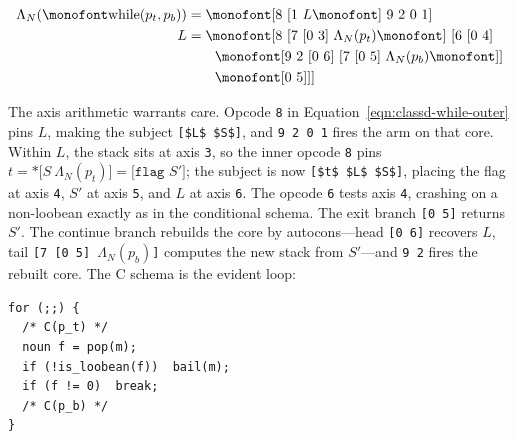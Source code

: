 \documentclass[twoside]{article}
\begin{document}
\begin{subequations}\label{eqn:classd-while}
  \begin{align}
    \Lambda_N(\texttt{while}(p_t, p_b)) &= \texttt{[8\ [1\ } L \texttt{]\ 9\ 2\ 0\ 1]} \label{eqn:classd-while-outer} \\
    L &= \texttt{[8\ [7\ [0\ 3]\ } \Lambda_N(p_t) \texttt{]\ [6\ [0\ 4]} \notag \\
      &\qquad \texttt{[9\ 2\ [0\ 6]\ [7\ [0\ 5]\ } \Lambda_N(p_b) \texttt{]]} \notag \\
      &\qquad \texttt{[0\ 5]]]} \label{eqn:classd-while-arm}
  \end{align}
\end{subequations}

\noindent
The axis arithmetic warrants care.  Opcode \lstinline[style=inlinecode]{8} in Equation~\ref{eqn:classd-while-outer} pins $L$, making the subject \lstinline[style=inlinecode,mathescape]{[$L$ $S$]}, and \lstinline[style=inlinecode]{9 2 0 1} fires the arm on that core.  Within $L$, the stack sits at axis \lstinline[style=inlinecode]{3}, so the inner opcode \lstinline[style=inlinecode]{8} pins $t = \texttt{*[}S\ \Lambda_N(p_t)\texttt{]} = \texttt{[flag\ } S' \texttt{]}$; the subject is now \lstinline[style=inlinecode,mathescape]{[$t$ $L$ $S$]}, placing the flag at axis \lstinline[style=inlinecode]{4}, $S'$ at axis \lstinline[style=inlinecode]{5}, and $L$ at axis \lstinline[style=inlinecode]{6}.  The opcode \lstinline[style=inlinecode]{6} tests axis \lstinline[style=inlinecode]{4}, crashing on a non-loobean exactly as in the conditional schema.  The exit branch \lstinline[style=inlinecode]{[0 5]} returns $S'$.  The continue branch rebuilds the core by autocons---head \lstinline[style=inlinecode]{[0 6]} recovers $L$, tail \texttt{[7 [0 5] $\Lambda_N(p_b)$]} computes the new stack from $S'$---and \lstinline[style=inlinecode]{9 2} fires the rebuilt core.  The C schema is the evident loop:

\begin{lstlisting}[style=listingcode_c]
for (;;) {
  /* C(p_t) */
  noun f = pop(m);
  if (!is_loobean(f))  bail(m);
  if (f != 0)  break;
  /* C(p_b) */
}
\end{lstlisting}
\end{document}
